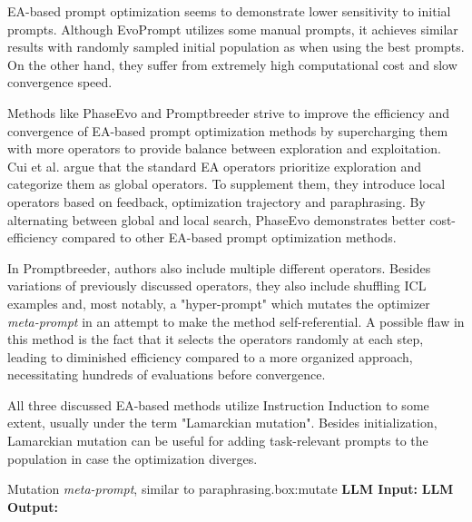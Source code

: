 EA-based prompt optimization seems to demonstrate lower sensitivity to initial prompts. Although EvoPrompt utilizes some manual prompts,
it achieves similar results with randomly sampled initial population as when using the best prompts\cite{guo2024connectinglargelanguagemodels}.
On the other hand, they suffer from extremely high computational cost and slow convergence speed\cite{cui2024phaseevounifiedincontextprompt}.

Methods like PhaseEvo\cite{cui2024phaseevounifiedincontextprompt} and Promptbreeder\cite{fernando2023promptbreederselfreferentialselfimprovementprompt} strive to
improve the efficiency and convergence of EA-based prompt optimization methods by supercharging them with more operators to provide balance between exploration and exploitation.
Cui et al.\cite{cui2024phaseevounifiedincontextprompt} argue that the standard EA operators prioritize exploration and categorize them as global operators.
To supplement them, they introduce local operators based on feedback, optimization trajectory and paraphrasing. By alternating between global and local 
search, PhaseEvo demonstrates better cost-efficiency compared to other EA-based prompt optimization methods\cite{cui2024phaseevounifiedincontextprompt}. 

In Promptbreeder\cite{fernando2023promptbreederselfreferentialselfimprovementprompt}, authors also include multiple different operators.
Besides variations of previously discussed operators, they also include shuffling ICL examples and, most notably, a "hyper-prompt" which mutates 
the optimizer \textit{meta-prompt} in an attempt to make the method self-referential. A possible flaw in this method is the fact that it
selects the operators randomly at each step, leading to diminished efficiency compared to a more organized approach\cite{cui2024phaseevounifiedincontextprompt}, 
necessitating hundreds of evaluations before convergence\cite{wan2024teachbettersmarterinstructions}.

All three discussed EA-based methods utilize Instruction Induction\cite{honovich2022instructioninductionexamplesnatural} to some extent, usually under the term "Lamarckian mutation". 
Besides initialization, Lamarckian mutation can be useful for adding task-relevant prompts to the population in case the optimization diverges\cite{fernando2023promptbreederselfreferentialselfimprovementprompt}. 

\begin{figurebox}{Mutation \textit{meta-prompt}, similar to paraphrasing.}{box:mutate}
    \textbf{LLM Input:} 
    \textbf{LLM Output:} 
\end{figurebox}

